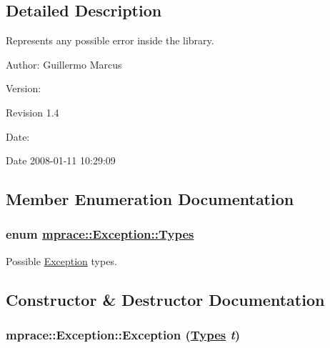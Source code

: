 \subsection{Detailed Description}
Represents any possible error inside the library. 

\begin{Desc}
\item[Author:]Guillermo Marcus \end{Desc}
\begin{Desc}
\item[Version:]\begin{Desc}
\item[Revision]1.4 \end{Desc}
\end{Desc}
\begin{Desc}
\item[Date:]\begin{Desc}
\item[Date]2008-01-11 10:29:09 \end{Desc}
\end{Desc}




\subsection{Member Enumeration Documentation}
\hypertarget{classmprace_1_1Exception_w12}{
\subsubsection[Types]{\setlength{\rightskip}{0pt plus 5cm}enum \hyperlink{classmprace_1_1Exception_w12}{mprace::Exception::Types}}}
\label{classmprace_1_1Exception_w12}


Possible \hyperlink{classmprace_1_1Exception}{Exception} types. 



\subsection{Constructor \& Destructor Documentation}
\hypertarget{classmprace_1_1Exception_a0}{
\subsubsection[Exception]{\setlength{\rightskip}{0pt plus 5cm}mprace::Exception::Exception (\hyperlink{classmprace_1_1Exception_w12}{Types} {\em t})}}
\label{classmprace_1_1Exception_a0}


